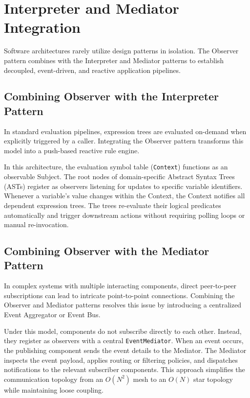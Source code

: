 \documentclass[12pt,a4paper]{article}
\begin{document}
\newpage
\section{Interpreter and Mediator Integration}

Software architectures rarely utilize design patterns in isolation. The Observer pattern combines with the Interpreter and Mediator patterns to establish decoupled, event-driven, and reactive application pipelines.

\subsection{Combining Observer with the Interpreter Pattern}
In standard evaluation pipelines, expression trees are evaluated on-demand when explicitly triggered by a caller. Integrating the Observer pattern transforms this model into a push-based reactive rule engine.

In this architecture, the evaluation symbol table (\texttt{Context}) functions as an observable Subject. The root nodes of domain-specific Abstract Syntax Trees (ASTs) register as observers listening for updates to specific variable identifiers. Whenever a variable's value changes within the Context, the Context notifies all dependent expression trees. The trees re-evaluate their logical predicates automatically and trigger downstream actions without requiring polling loops or manual re-invocation.

\subsection{Combining Observer with the Mediator Pattern}
In complex systems with multiple interacting components, direct peer-to-peer subscriptions can lead to intricate point-to-point connections. Combining the Observer and Mediator patterns resolves this issue by introducing a centralized Event Aggregator or Event Bus.

Under this model, components do not subscribe directly to each other. Instead, they register as observers with a central \texttt{EventMediator}. When an event occurs, the publishing component sends the event details to the Mediator. The Mediator inspects the event payload, applies routing or filtering policies, and dispatches notifications to the relevant subscriber components. This approach simplifies the communication topology from an $O(N^2)$ mesh to an $O(N)$ star topology while maintaining loose coupling.
\end{document}
